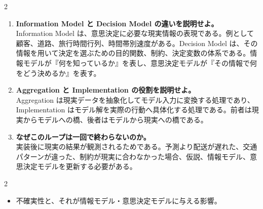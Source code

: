 \begin{multicols}{2}
\begin{enumerate}
\item \textbf{Information Model と Decision Model の違いを説明せよ。}\\
Information Model は、意思決定に必要な現実情報の表現である。例として顧客、道路、旅行時間行列、時間帯別速度がある。Decision Model は、その情報を用いて決定を選ぶための目的関数、制約、決定変数の体系である。情報モデルが『何を知っているか』を表し、意思決定モデルが『その情報で何をどう決めるか』を表す。
\item \textbf{Aggregation と Implementation の役割を説明せよ。}\\
Aggregation は現実データを抽象化してモデル入力に変換する処理であり、Implementation はモデル解を実際の行動へ具体化する処理である。前者は現実からモデルへの橋、後者はモデルから現実への橋である。
\item \textbf{なぜこのループは一回で終わらないのか。}\\
実装後に現実の結果が観測されるためである。予測より配送が遅れた、交通パターンが違った、制約が現実に合わなかった場合、仮説、情報モデル、意思決定モデルを更新する必要がある。
\end{enumerate}

\end{multicols}

\clearpage



\vspace{1.5mm}

\begin{multicols}{2}

\footnotesize

\raggedcolumns


\begin{itemize}
\item 不確実性と、それが情報モデル・意思決定モデルに与える影響。
\end{itemize}

\end{multicols}